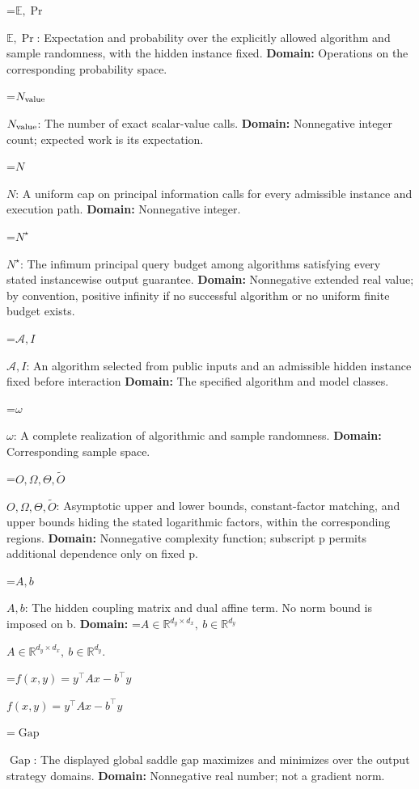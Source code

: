 \documentclass[10pt,a4paper]{article}
\newcommand{\AtlasMath}[1]{\par\begingroup\centering\setbox0=\hbox{$\displaystyle #1$}\ifdim\wd0>1.4\linewidth\typeout{ATLAS WIDE FORMULA: \the\wd0}\fi\ifdim\wd0>\linewidth\resizebox{\linewidth}{!}{\box0}\else\box0\fi\par\endgroup}
\newcommand{\AtlasInlineMath}[1]{\begingroup\setbox0=\hbox{$#1$}\ifdim\wd0>.4\linewidth\endgroup\AtlasMath{#1}\else\endgroup$#1$\fi}
\begin{document}
\AtlasInlineMath{\mathbb E,\Pr}: Expectation and probability over the explicitly allowed algorithm and sample randomness, with the hidden instance fixed. \textbf{Domain:} Operations on the corresponding probability space.



\AtlasInlineMath{N_{\rm value}}: The number of exact scalar-value calls. \textbf{Domain:} Nonnegative integer count; expected work is its expectation.



\AtlasInlineMath{N}: A uniform cap on principal information calls for every admissible instance and execution path. \textbf{Domain:} Nonnegative integer.



\AtlasInlineMath{N^\star}: The infimum principal query budget among algorithms satisfying every stated instancewise output guarantee. \textbf{Domain:} Nonnegative extended real value; by convention, positive infinity if no successful algorithm or no uniform finite budget exists.



\AtlasInlineMath{\mathcal A,I}: An algorithm selected from public inputs and an admissible hidden instance fixed before interaction \textbf{Domain:} The specified algorithm and model classes.



\AtlasInlineMath{\omega}: A complete realization of algorithmic and sample randomness. \textbf{Domain:} Corresponding sample space.



\AtlasInlineMath{O,\Omega,\Theta,\widetilde O}: Asymptotic upper and lower bounds, constant-factor matching, and upper bounds hiding the stated logarithmic factors, within the corresponding regions. \textbf{Domain:} Nonnegative complexity function; subscript p permits additional dependence only on fixed p.



\AtlasInlineMath{A,b}: The hidden coupling matrix and dual affine term. No norm bound is imposed on b. \textbf{Domain:} \AtlasInlineMath{A\in\mathbb R^{d_y\times d_x},\ b\in\mathbb R^{d_y}}.



\AtlasInlineMath{f(x,y)=y^\top Ax-b^\top y}



\AtlasInlineMath{\operatorname{Gap}}: The displayed global saddle gap maximizes and minimizes over the output strategy domains. \textbf{Domain:} Nonnegative real number; not a gradient norm.
\end{document}
